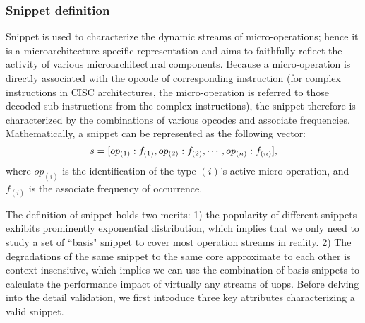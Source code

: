 \subsubsection{Snippet definition}
Snippet is used to characterize the dynamic streams of micro-operations; hence it is a microarchitecture-specific representation and aims to faithfully reflect the activity of various microarchitectural components.  Because a micro-operation is directly associated with the opcode of corresponding instruction (for complex instructions in CISC architectures, the micro-operation is referred to those decoded sub-instructions from the complex instructions), the snippet therefore is characterized by the combinations of various opcodes and associate frequencies.  Mathematically,  a snippet can be represented as the following vector:
\begin{equation}
 s=[op_{(1)}: f_{{(1)}}, op_{(2)}:f_{{(2)}}, \cdots, \\op_{(n)}:f_{{(n)}}],
\end{equation}
where  $op_{(i)}$ is the identification of the type $(i)$'s active micro-operation, and $f_{{(i)}}$ is the associate  frequency of occurrence.  


The definition of snippet holds two merits: 1) the popularity of different snippets exhibits prominently exponential distribution, which implies that we only need to study a set of ``basis" snippet to cover most operation streams in reality. 2) The degradations of the same snippet to the same core approximate to each other is context-insensitive,  which implies we can use the combination of basis snippets to calculate the performance impact of virtually any streams of uops.  Before delving into the detail validation, we first introduce three key attributes characterizing a valid snippet.

